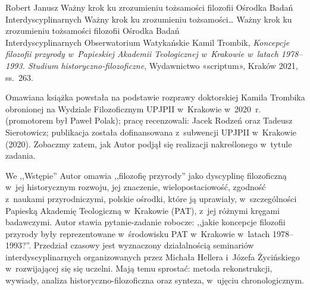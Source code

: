 \begin{newrevplenv}{Robert Janusz}
	{Ważny krok ku zrozumieniu tożsamości filozofii Ośrodka Badań Interdyscyplinarnych}
	{Ważny krok ku zrozumieniu tożsamości\ldots}
	{Ważny krok ku zrozumieniu tożsamości filozofii Ośrodka Badań\\
	Interdyscyplinarnych}
	{Obserwatorium Watykańskie}
	{Kamil Trombik, \textit{Koncepcje filozofii przyrody w~Papieskiej Akademii Teologicznej w~Krakowie w~latach 1978--1993. Studium historyczno-filozoficzne}, Wydawnictwo «scriptum», Kraków 2021, ss.~263.}

\lettrine[loversize=0.13,lines=2,lraise=-0.03,nindent=0em,findent=0.2pt]%
{O}{}mawiana książka powstała na podstawie rozprawy doktorskiej Kamila Trombika obronionej na Wydziale Filozoficznym UPJPII w~Krakowie w~2020~r. (promotorem był Paweł Polak); pracę recenzowali: Jacek Rodzeń oraz Tadeusz Sierotowicz; publikacja została dofinansowana z~subwencji UPJPII w~Krakowie (2020).
Zobaczmy zatem, jak Autor podjął się realizacji nakreślonego w~tytule zadania.

We ,,Wstępie'' Autor omawia ,,filozofię przyrody'' jako dyscyplinę filozoficzną w~jej historycznym rozwoju, jej znaczenie, wielopostaciowość, zgodność z~naukami przyrodniczymi, polskie ośrodki, które ją uprawiały, w~szczególności Papieską Akademię Teologiczną w~Krakowie (PAT), z~jej różnymi kręgami badawczymi. Autor stawia pytanie-zadanie robocze: ,,jakie koncepcje filozofii przyrody były reprezentowane w~środowisku PAT w~Krakowie w~latach 1978--1993?''. Przedział czasowy jest wyznaczony działalnością seminariów interdyscyplinarnych organizowanych przez Michała Hellera i~Józefa Życińskiego w~rozwijającej się się uczelni. Mają temu sprostać: metoda rekonstrukcji, wywiady, analiza historyczno-filozoficzna oraz synteza, w~ujęciu chronologicznym.


\end{newrevplenv}
